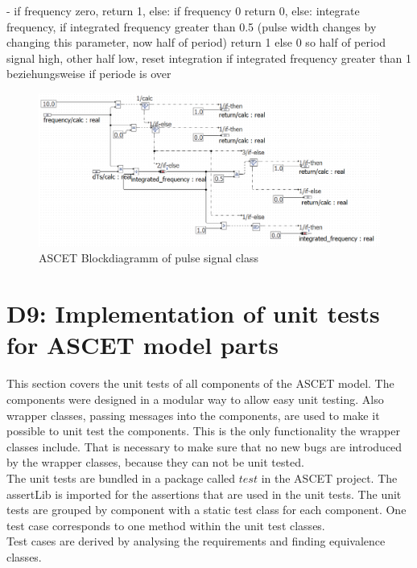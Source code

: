 - if frequency zero, return 1, else: if frequency 0 return 0, else: integrate frequency, if integrated frequency greater than 0.5 (pulse width changes by changing this parameter, now half of period) return 1 else 0 so half of period signal high, other half low, reset integration if integrated frequency greater than 1 beziehungsweise if periode is over\\

\begin{figure}[H]
\centering
\includegraphics[width=1\textwidth]{images/Blockdiagramm_PulseSignalClass.png}
\caption{ASCET Blockdiagramm of pulse signal class}
\label{fig:BlockdiagrammPulseSignal}
\end{figure}



\chapter{D9: Implementation of unit tests for ASCET model parts}\label{cha:D9}
This section covers the unit tests of all components of the ASCET model.
The components were designed in a modular way to allow easy unit testing.
Also wrapper classes, passing messages into the components, are used to make it possible to unit test the components.
This is the only functionality the wrapper classes include.
That is necessary to make sure that no new bugs are introduced by the wrapper classes, because they can not be unit tested.\\
The unit tests are bundled in a package called $test$ in the ASCET project. The assertLib is imported for the assertions that are used in the unit tests. The unit tests are grouped by component with a static test class for each component. One test case corresponds to one method within the unit test classes.\\

Test cases are derived by analysing the requirements and finding equivalence classes.


